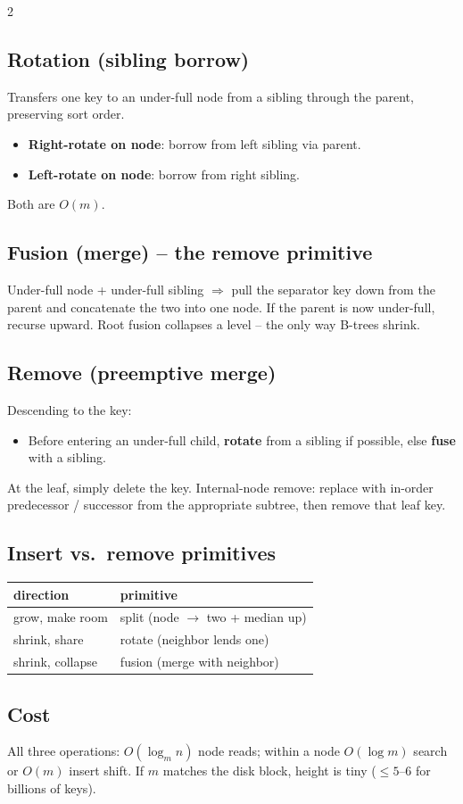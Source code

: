 \documentclass[10pt]{article}
\begin{document}
\begin{multicols}{2}
\subsection*{Rotation (sibling borrow)}
Transfers one key to an under-full node from a sibling through the
parent, preserving sort order.
\begin{itemize}
    \item \textbf{Right-rotate on node}: borrow from left sibling via
    parent.
    \item \textbf{Left-rotate on node}: borrow from right sibling.
\end{itemize}
Both are $O(m)$.

\subsection*{Fusion (merge) -- the remove primitive}
Under-full node + under-full sibling $\Rightarrow$ pull the separator key
down from the parent and concatenate the two into one node.
If the parent is now under-full, recurse upward. Root fusion
collapses a level -- the only way B-trees shrink.

\subsection*{Remove (preemptive merge)}
Descending to the key:
\begin{itemize}
    \item Before entering an under-full child, \textbf{rotate} from a
    sibling if possible, else \textbf{fuse} with a sibling.
\end{itemize}
At the leaf, simply delete the key. Internal-node remove: replace
with in-order predecessor / successor from the appropriate subtree,
then remove that leaf key.

\subsection*{Insert vs.\ remove primitives}
\begin{tabular}{@{}l|l@{}}
\textbf{direction} & \textbf{primitive}\\
\hline
grow, make room    & split (node $\to$ two + median up)\\
shrink, share      & rotate (neighbor lends one)\\
shrink, collapse   & fusion (merge with neighbor)
\end{tabular}

\subsection*{Cost}
All three operations: $O(\log_m n)$ node reads; within a node
$O(\log m)$ search or $O(m)$ insert shift. If $m$ matches the disk
block, height is tiny ($\le 5$--6 for billions of keys).


\end{multicols}
\end{document}
